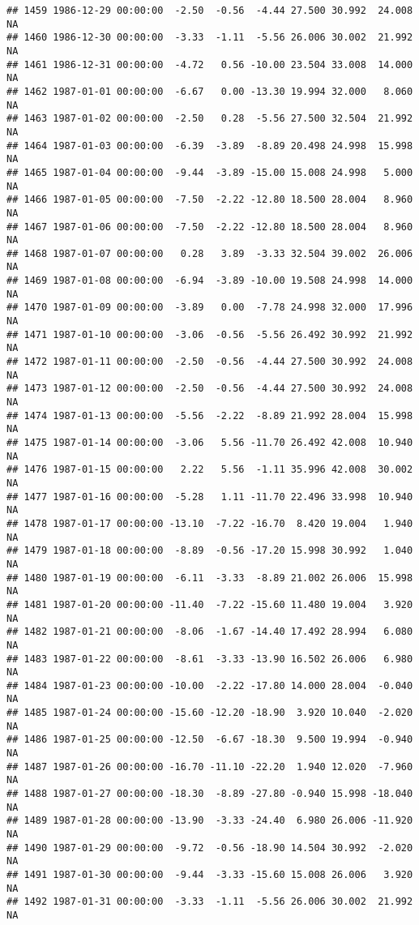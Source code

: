 \documentclass{article}\usepackage{graphicx, color}
\makeatletter
\newenvironment{kframe}{%
 \def\at@end@of@kframe{}%
 \ifinner\ifhmode%
  \def\at@end@of@kframe{\end{minipage}}%
  \begin{minipage}{\columnwidth}%
 \fi\fi%
 \def\FrameCommand##1{\hskip\@totalleftmargin \hskip-\fboxsep
 \colorbox{shadecolor}{##1}\hskip-\fboxsep
     \hskip-\linewidth \hskip-\@totalleftmargin \hskip\columnwidth}%
 \MakeFramed {\advance\hsize-\width
   \@totalleftmargin\z@ \linewidth\hsize
   \@setminipage}}%
 {\par\unskip\endMakeFramed%
 \at@end@of@kframe}
\newenvironment{knitrout}{}{} %
\makeatother
\begin{document}
\begin{knitrout}
\begin{kframe}
\begin{verbatim}
## 1459 1986-12-29 00:00:00  -2.50  -0.56  -4.44 27.500 30.992  24.008     NA
## 1460 1986-12-30 00:00:00  -3.33  -1.11  -5.56 26.006 30.002  21.992     NA
## 1461 1986-12-31 00:00:00  -4.72   0.56 -10.00 23.504 33.008  14.000     NA
## 1462 1987-01-01 00:00:00  -6.67   0.00 -13.30 19.994 32.000   8.060     NA
## 1463 1987-01-02 00:00:00  -2.50   0.28  -5.56 27.500 32.504  21.992     NA
## 1464 1987-01-03 00:00:00  -6.39  -3.89  -8.89 20.498 24.998  15.998     NA
## 1465 1987-01-04 00:00:00  -9.44  -3.89 -15.00 15.008 24.998   5.000     NA
## 1466 1987-01-05 00:00:00  -7.50  -2.22 -12.80 18.500 28.004   8.960     NA
## 1467 1987-01-06 00:00:00  -7.50  -2.22 -12.80 18.500 28.004   8.960     NA
## 1468 1987-01-07 00:00:00   0.28   3.89  -3.33 32.504 39.002  26.006     NA
## 1469 1987-01-08 00:00:00  -6.94  -3.89 -10.00 19.508 24.998  14.000     NA
## 1470 1987-01-09 00:00:00  -3.89   0.00  -7.78 24.998 32.000  17.996     NA
## 1471 1987-01-10 00:00:00  -3.06  -0.56  -5.56 26.492 30.992  21.992     NA
## 1472 1987-01-11 00:00:00  -2.50  -0.56  -4.44 27.500 30.992  24.008     NA
## 1473 1987-01-12 00:00:00  -2.50  -0.56  -4.44 27.500 30.992  24.008     NA
## 1474 1987-01-13 00:00:00  -5.56  -2.22  -8.89 21.992 28.004  15.998     NA
## 1475 1987-01-14 00:00:00  -3.06   5.56 -11.70 26.492 42.008  10.940     NA
## 1476 1987-01-15 00:00:00   2.22   5.56  -1.11 35.996 42.008  30.002     NA
## 1477 1987-01-16 00:00:00  -5.28   1.11 -11.70 22.496 33.998  10.940     NA
## 1478 1987-01-17 00:00:00 -13.10  -7.22 -16.70  8.420 19.004   1.940     NA
## 1479 1987-01-18 00:00:00  -8.89  -0.56 -17.20 15.998 30.992   1.040     NA
## 1480 1987-01-19 00:00:00  -6.11  -3.33  -8.89 21.002 26.006  15.998     NA
## 1481 1987-01-20 00:00:00 -11.40  -7.22 -15.60 11.480 19.004   3.920     NA
## 1482 1987-01-21 00:00:00  -8.06  -1.67 -14.40 17.492 28.994   6.080     NA
## 1483 1987-01-22 00:00:00  -8.61  -3.33 -13.90 16.502 26.006   6.980     NA
## 1484 1987-01-23 00:00:00 -10.00  -2.22 -17.80 14.000 28.004  -0.040     NA
## 1485 1987-01-24 00:00:00 -15.60 -12.20 -18.90  3.920 10.040  -2.020     NA
## 1486 1987-01-25 00:00:00 -12.50  -6.67 -18.30  9.500 19.994  -0.940     NA
## 1487 1987-01-26 00:00:00 -16.70 -11.10 -22.20  1.940 12.020  -7.960     NA
## 1488 1987-01-27 00:00:00 -18.30  -8.89 -27.80 -0.940 15.998 -18.040     NA
## 1489 1987-01-28 00:00:00 -13.90  -3.33 -24.40  6.980 26.006 -11.920     NA
## 1490 1987-01-29 00:00:00  -9.72  -0.56 -18.90 14.504 30.992  -2.020     NA
## 1491 1987-01-30 00:00:00  -9.44  -3.33 -15.60 15.008 26.006   3.920     NA
## 1492 1987-01-31 00:00:00  -3.33  -1.11  -5.56 26.006 30.002  21.992     NA

\end{verbatim}
\end{kframe}
\end{knitrout}
\end{document}
